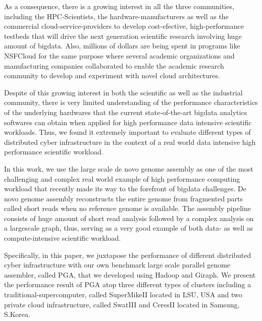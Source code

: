 \documentclass[conference]{IEEEtran}
\begin{document}
As a consequence, there is a growing interest in all the three communities, including the HPC-Scientists, the hardware-manufacturers as well as the commercial cloud-service-providers to develop cost-efective, high-performance testbeds that will drive the next generation scientific research involving huge amount of bigdata.
Also, millions of dollars are being spent in programs like NSFCloud for the same purpose where several academic organizations and manufacturing companies collaborated to enable the academic research community to develop and experiment with novel cloud architectures.

Despite of this growing interest in both the scientific as well as the industrial community, there is very limited understanding of the performance characteristics of the underlying hardwares that the current state-of-the-art bigdata analytics softwares can obtain when applied for high performance data intensive scientific workloads.
Thus, we found it extremely important to evaluate different types of distributed cyber infrastructure in the context of a real world data intensive high performance scientific workload.  

In this work, we use the large scale de novo genome assembly as one of the most challenging and complex real world example of high performance computing workload that recently made its way to the forefront of bigdata challenges.
De novo genome assembly reconstructs the entire genome from fragmented parts called short reads when no reference genome is available.
The assembly pipeline consists of huge amount of short read analysis followed by a  complex analysis on a largescale graph, thus, serving as a very good example of both data- as well as compute-intensive scientific workload.

Specifically, in this paper, we juxtapose the performance of different distributed cyber infrastructure with our own benchmark large scale parallel genome assembler, called PGA, that we developed using Hadoop and Giraph.
We present the performance result of PGA atop three different types of clusters including a traditional-supercomputer, called SuperMikeII located in LSU, USA and two private cloud infrastructure, called SwatIII and CeresII located in Samsung, S.Korea.
\end{document}
